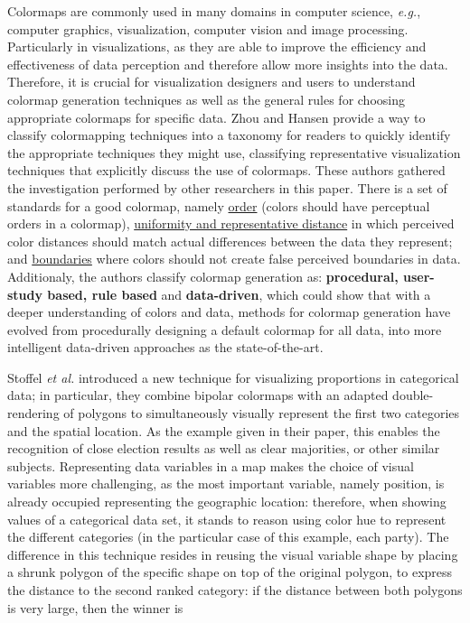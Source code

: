 %
Colormaps are commonly used in many domains in computer science, \emph{e.g.}, computer graphics, visualization, computer vision and image processing.
Particularly in visualizations, as they are able to improve the efficiency and effectiveness of data perception and therefore allow more insights
into the data. Therefore, it is crucial for visualization designers and users to understand colormap generation techniques as well as the general
rules for choosing appropriate colormaps for specific data. Zhou and Hansen \cite{Zhou2016} provide a way to classify colormapping techniques into
a taxonomy for readers to quickly identify the appropriate techniques they might use, classifying representative visualization techniques that
explicitly discuss the use of colormaps. These authors gathered the investigation performed by other researchers in this paper. There is a set of
standards for a good colormap, namely \ul{order} (colors should have perceptual orders in a colormap), \ul{uniformity and representative distance}
in which perceived color distances should match actual differences between the data they represent; and \ul{boundaries} where colors should not
create false perceived boundaries in data. Additionaly, the authors classify colormap generation as: \textbf{procedural, user-study based, rule
based} and \textbf{data-driven}, which could show that with a deeper understanding of colors and data,
methods for colormap generation have evolved from procedurally designing a default colormap for all data, into more intelligent data-driven approaches
as the state-of-the-art. \par
%
Stoffel \emph{et al.} introduced a new technique \cite{Stoffel2012} for visualizing proportions in categorical data; in particular, they combine bipolar colormaps
with an adapted double-rendering of polygons to simultaneously visually represent the first two categories and the spatial location. As the example given
in their paper, this enables the recognition of close election results as well as clear majorities, or other similar subjects. Representing data variables
in a map makes the choice of visual variables more challenging, as the most important variable, namely position, is already occupied representing the geographic location:
therefore, when showing values of a categorical data set, it stands to reason using color hue to represent the different categories (in the particular case of this
example, each party). The difference in this technique resides in reusing the visual variable shape by placing a shrunk polygon of the specific shape
on top of the original polygon, to express the distance to the second ranked category: if the distance between both polygons is very large, then the winner is
